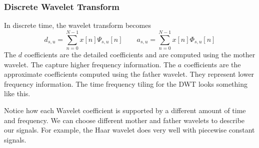 \documentclass{article}
\begin{document}
\subsubsection{Discrete Wavelet Transform}
In discrete time, the wavelet transform becomes
$$d_{s,u}=\sum_{n=0}^{N-1}x[n]\Psi_{s,u}[n] \qquad a_{s,u}=\sum_{n=0}^{N-1}x[n]\Phi_{s,u}[n]$$
The $d$ coefficients are the detailed coefficients and are computed using the mother wavelet. The capture higher frequency information.
The $a$ coefficients are the approximate coefficients computed using the father wavelet. They represent lower frequency information.
The time frequency tiling for the DWT looks something like this.
\begin{figure}[H]
  \centering
\end{figure}
Notice how each Wavelet coefficient is supported by a different amount of time and frequency.
We can choose different mother and father wavelets to describe our signals. For example, the Haar wavelet
does very well with piecewise constant signals.
\end{document}
